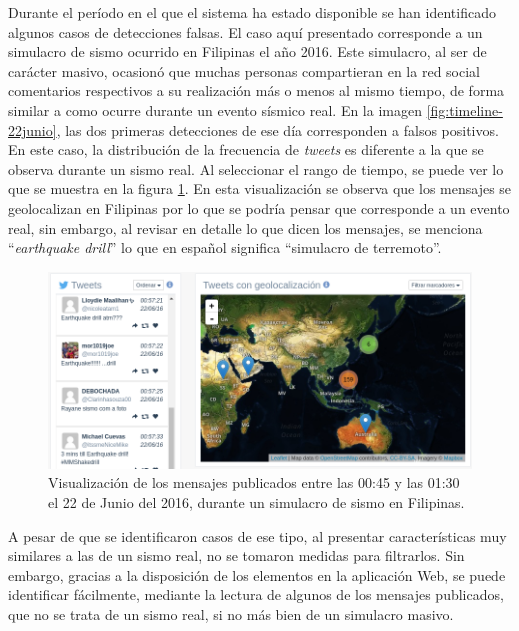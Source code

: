 	Durante el período en el que el sistema ha estado disponible se han identificado algunos casos de detecciones falsas. El caso aquí presentado corresponde a un simulacro de sismo ocurrido en Filipinas el año 2016. Este simulacro, al ser de carácter masivo, ocasionó que muchas personas compartieran en la red social comentarios respectivos a su realización más o menos al mismo tiempo, de forma similar a como ocurre durante un evento sísmico real. En la imagen \ref{fig:timeline-22junio}, las dos primeras detecciones de ese día corresponden a falsos positivos. En este caso, la distribución de la frecuencia de \textit{tweets} es diferente a la que se observa durante un sismo real. Al seleccionar el rango de tiempo, se puede ver lo que se muestra en la figura \ref{fig:earthquakedrill}. En esta visualización se observa que los mensajes se geolocalizan en Filipinas por lo que se podría pensar que corresponde a un evento real, sin embargo, al revisar en detalle lo que dicen los mensajes, se menciona ``\textit{earthquake drill}'' lo que en español significa ``simulacro de terremoto''. 
	
	\begin{figure}[h]
	  \centering
	  \includegraphics[width=\textwidth]{imagenes/earthquakedrill.png}
	  \caption{Visualización de los mensajes publicados entre las 00:45 y las 01:30 el 22 de Junio del 2016, durante un simulacro de sismo en Filipinas.}
		\label{fig:earthquakedrill}
	\end{figure}	
	
	A pesar de que se identificaron casos de ese tipo, al presentar características muy similares a las de un sismo real, no se tomaron medidas para filtrarlos. Sin embargo, gracias a la disposición de los elementos en la aplicación Web, se puede identificar fácilmente, mediante la lectura de algunos de los mensajes publicados, que no se trata de un sismo real, si no más bien de un simulacro masivo. 
	
